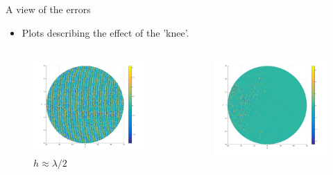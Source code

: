 \documentclass{beamer}
\begin{document}
\begin{frame}{A view of the errors}
 \begin{itemize}
  \item Plots describing the effect of the 'knee'.
 \end{itemize}
\begin{columns}
  \begin{column}{0.5\textwidth}
    \begin{center}
    \begin{figure}
    \includegraphics[width=\textwidth]{error_lambdaper2.png}
    \caption{$h \approx \lambda/2$}
    \end{figure}
    \end{center}  
  \end{column}
  \begin{column}{0.5\textwidth}
    \begin{center}
    \begin{figure}
    \includegraphics[width=\textwidth]{error_lambda.png}

\end{figure}
\end{center}
\end{column}
\end{columns}
\end{frame}
\end{document}
